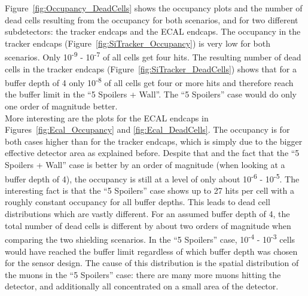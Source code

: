 Figure~\ref{fig:Occupancy_DeadCells} shows the occupancy plots and the number of dead cells resulting from the occupancy for both scenarios, and for two different subdetectors: the tracker endcaps and the ECAL endcaps.
The occupancy in the tracker endcaps (Figure~\ref{fig:SiTracker_Occupancy}) is very low for both scenarios.
Only 10\textsuperscript{-9} - 10\textsuperscript{-7} of all cells get four hits.
The resulting number of dead cells in the tracker endcaps (Figure~\ref{fig:SiTracker_DeadCells}) shows that for a buffer depth of 4 only 10\textsuperscript{-8} of all cells get four or more hits and therefore reach the buffer limit in the ``5 Spoilers + Wall''.
The ``5 Spoilers'' case would do only one order of magnitude better.\\
More interesting are the plots for the ECAL endcaps in Figures~\ref{fig:Ecal_Occupancy} and \ref{fig:Ecal_DeadCells}.
The occupancy is for both cases higher than for the tracker endcaps, which is simply due to the bigger effective detector area as explained before.
Despite that and the fact that the ``5 Spoilers + Wall'' case is better by an order of magnitude (when looking at a buffer depth of 4), the occupancy is still at a level of only about 10\textsuperscript{-6} - 10\textsuperscript{-5}.
The interesting fact is that the ``5 Spoilers'' case shows up to 27 hits per cell with a roughly constant occupancy for all buffer depths.
This leads to dead cell distributions which are vastly different.
For an assumed buffer depth of 4, the total number of dead cells is different by about two orders of magnitude when comparing the two shielding scenarios.
In the ``5 Spoilers'' case, 10\textsuperscript{-4} - 10\textsuperscript{-3} cells would have reached the buffer limit regardless of which buffer depth was chosen for the sensor design.
The cause of this distribution is the spatial distribution of the muons in the ``5 Spoilers'' case: there are many more muons hitting the detector, and additionally all concentrated on a small area of the detector.

